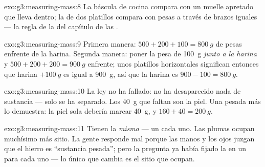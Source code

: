 \begin{solution}{exo:g3:measuring-mass:8}
La báscula de cocina compara con un muelle apretado que lleva dentro;
la  de dos platillos compara con pesas a través de brazos
iguales --- la regla de la  del capítulo de las .
\end{solution}

\begin{solution}{exo:g3:measuring-mass:9}
Primera manera: $500 + 200 + 100 = \qty{800}{g}$ de pesas enfrente de
la harina. Segunda manera: poner la pesa de \qty{100}{g} \emph{junto a
la harina} y $500 + 200 + 200 = \qty{900}{g}$ enfrente; unos platillos
horizontales significan entonces que harina $+ \qty{100}{g}$ es igual
a \qty{900}{g}, así que la harina es $900 - 100 = \qty{800}{g}$.
\end{solution}

\begin{solution}{exo:g3:measuring-mass:10}
La ley no ha fallado: no ha desaparecido nada de sustancia --- solo se
ha separado. Los \qty{40}{g} que faltan son la piel. Una pesada más lo
demuestra: la piel sola debería marcar \qty{40}{g}, y
$160 + 40 = \qty{200}{g}$.
\end{solution}

\begin{solution}{exo:g3:measuring-mass:11}
Tienen la \emph{misma}  --- un  cada uno. Las plumas
ocupan muchísimo más sitio. La gente responde mal porque las manos y
los ojos juzgan que el hierro es ``sustancia pesada''; pero la
pregunta ya había fijado la  en un  para cada uno ---
lo único que cambia es el sitio que ocupan.
\end{solution}
